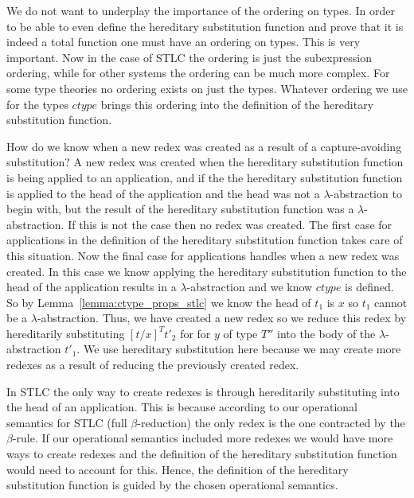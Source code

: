 We do not want to underplay the importance of the ordering on types.
In order to be able to even define the hereditary substitution
function and prove that it is indeed a total function one must have an
ordering on types.  This is very important.  Now in the case of STLC
the ordering is just the subexpression ordering, while for other
systems the ordering can be much more complex.  For some type theories
no ordering exists on just the types.  Whatever ordering we use for
the types $ctype$ brings this ordering into the definition of the
hereditary substitution function.

How do we know when a new redex was created as a result of a
capture-avoiding substitution?  A new redex was created when the
hereditary substitution function is being applied to an application,
and if the the hereditary substitution function is applied to the head
of the application and the head was not a $\lambda$-abstraction to
begin with, but the result of the hereditary substitution function was
a $\lambda$-abstraction.  If this is not the case then no redex was
created.  The first case for applications in the definition of the
hereditary substitution function takes care of this situation.  Now
the final case for applications handles when a new redex was created.
In this case we know applying the hereditary substitution function to
the head of the application results in a $\lambda$-abstraction and we
know $ctype$ is defined.  So by
Lemma~\ref{lemma:ctype_props_stlc} we know the head of $t_1$ is $x$ so
$t_1$ cannot be a $\lambda$-abstraction.  Thus, we have created a new
redex so we reduce this redex by hereditarily substituting 
$[t/x]^T t'_2$ for for $y$ of type $T''$ into the body of the
$\lambda$-abstraction $t'_1$.  We use hereditary substitution here
because we may create more redexes as a result of reducing the
previously created redex.

In STLC the only way to create redexes is through hereditarily
substituting into the head of an application.  This is because
according to our operational semantics for STLC (full
$\beta$-reduction) the only redex is the one contracted by the $\beta$-rule.  If our
operational semantics included more redexes we would have more ways to
create redexes and the definition of the hereditary substitution
function would need to account for this.  Hence, the definition of the
hereditary substitution function is guided by the chosen operational
semantics.  

